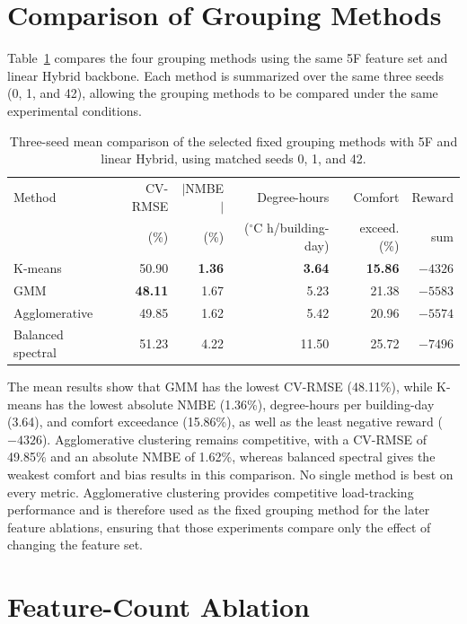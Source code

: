 \section{Comparison of Grouping Methods}

Table~\ref{tab:grouping-methods} compares the four grouping methods using the
same 5F feature set and linear Hybrid backbone. Each method is summarized over
the same three seeds (0, 1, and 42), allowing the grouping methods to be compared
under the same experimental conditions.

\begin{table}[!htbp]
\small
\begin{center}
\begin{tabular}{|l|r|r|r|r|r|}
\hline
Method & CV-RMSE & $|$NMBE$|$ & Degree-hours & Comfort & Reward \\
 & (\%) & (\%) & ($^\circ$C h/building-day) & exceed. (\%) & sum \\
\hline
K-means & 50.90 & \textbf{1.36} & \textbf{3.64} & \textbf{15.86} & \textbf{$-4326$} \\
GMM & \textbf{48.11} & 1.67 & 5.23 & 21.38 & $-5583$ \\
Agglomerative & 49.85 & 1.62 & 5.42 & 20.96 & $-5574$ \\
Balanced spectral & 51.23 & 4.22 & 11.50 & 25.72 & $-7496$ \\
\hline
\end{tabular}
\end{center}
\caption{Three-seed mean comparison of the selected fixed grouping methods
with 5F and linear Hybrid, using matched seeds 0, 1, and 42.}
\label{tab:grouping-methods}
\end{table}

The mean results show that GMM has the lowest CV-RMSE (48.11\%), while K-means
has the lowest absolute NMBE (1.36\%), degree-hours per building-day (3.64), and
comfort exceedance (15.86\%), as well as the least negative reward ($-4326$).
Agglomerative clustering remains competitive, with a CV-RMSE of 49.85\% and an
absolute NMBE of 1.62\%, whereas balanced spectral gives the weakest comfort and
bias results in this comparison. No single method is best on every metric.
Agglomerative clustering provides competitive load-tracking performance and is
therefore used as the fixed grouping method for the later feature ablations,
ensuring that those experiments compare only the effect of changing the feature
set.

\section{Feature-Count Ablation}

